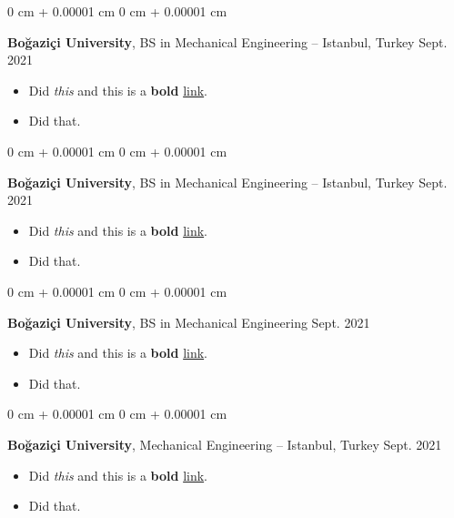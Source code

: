 \documentclass[10pt, letterpaper]{article}
\newenvironment{highlights}{
    \begin{itemize}[
        topsep=0.10 cm,
        parsep=0.10 cm,
        partopsep=0pt,
        itemsep=0pt,
        leftmargin=0 cm + 10pt
    ]
}{
    \end{itemize}
        
    \vspace{-0.20cm}
} %
\newenvironment{onecolentry}{
    \begin{adjustwidth}{
        0 cm + 0.00001 cm
    }{
        0 cm + 0.00001 cm
    }
}{
    \end{adjustwidth}
} %
\begin{document}
        \vspace{0.1 cm}

        \begin{onecolentry}
            \textbf{Boğaziçi University}, BS in Mechanical Engineering -- Istanbul, Turkey \hfill Sept. 2021
            \begin{highlights}
                \item Did \textit{this} and this is a \textbf{bold} \href{https://example.com}{link}.
                \item Did that.
            \end{highlights}
        \end{onecolentry}

        \vspace{0.1 cm}

        \begin{onecolentry}
            \textbf{Boğaziçi University}, BS in Mechanical Engineering -- Istanbul, Turkey \hfill Sept. 2021
            \begin{highlights}
                \item Did \textit{this} and this is a \textbf{bold} \href{https://example.com}{link}.
                \item Did that.
            \end{highlights}
        \end{onecolentry}

        \vspace{0.1 cm}

        \begin{onecolentry}
            \textbf{Boğaziçi University}, BS in Mechanical Engineering \hfill Sept. 2021
            \begin{highlights}
                \item Did \textit{this} and this is a \textbf{bold} \href{https://example.com}{link}.
                \item Did that.
            \end{highlights}
        \end{onecolentry}

        \vspace{0.1 cm}

        \begin{onecolentry}
            \textbf{Boğaziçi University}, Mechanical Engineering -- Istanbul, Turkey \hfill Sept. 2021
            \begin{highlights}
                \item Did \textit{this} and this is a \textbf{bold} \href{https://example.com}{link}.
                \item Did that.
            \end{highlights}
        \end{onecolentry}
\end{document}
